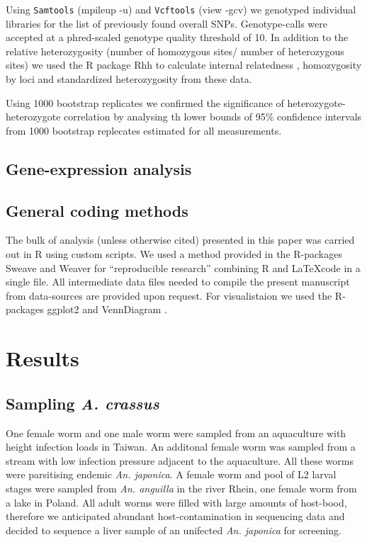 \documentclass[10pt]{bmc_article}
\newenvironment{bmcformat}{\begin{raggedright}\baselineskip20pt\sloppy\setboolean{publ}{false}}{\end{raggedright}\baselineskip20pt\sloppy}
\begin{document}
\begin{bmcformat}
Using \texttt{Samtools} \cite{journals/bioinformatics/LiHWFRHMAD09}
(mpileup -u) and \texttt{Vcftools}\cite{pmid21653522} (view -gcv) we
genotyped individual libraries for the list of previously found
overall SNPs. Genotype-calls were accepted at a phred-scaled genotype
quality threshold of 10. In addition to the relative heterozygosity
(number of homozygous sites/ number of heterozygous sites) we used the
R package Rhh \cite{pmid21565077} to calculate internal relatedness
\cite{pmid11571049}, homozygosity by loci \cite{pmid17107491} and
standardized heterozygosity \cite{coltman81j} from these data.

Using 1000 bootstrap replicates we confirmed the significance of
heterozygote-heterozygote correlation by analysing th lower bounds of
95\% confidence intervals from 1000 bootstrap replecates estimated for
all measurements.

\subsection*{Gene-expression analysis}




\subsection*{General coding methods}

The bulk of analysis (unless otherwise cited) presented in this paper
was carried out in R \cite{R_project} using custom scripts. We used a
method provided in the R-packages
Sweave\cite{lmucs-papers:Leisch:2002} and Weaver\cite{weaver} for
``reproducible research'' combining R and \LaTeX code in a single
file. All intermediate data files needed to compile the present
manuscript from data-sources are provided upon request. For
visualistaion we used the R-packages ggplot2 \cite{ggplot-book} and
VennDiagram \cite{pmid21269502}.


\section*{Results}


\subsection*{Sampling \textit{A. crassus}}

One female worm and one male worm were sampled from an aquaculture
with height infection loads in Taiwan. An additonal female worm was
sampled from a stream with low infection pressure adjacent to the
aquaculture. All these worms were parsitising endemic
\textit{An. japonica}. A female worm and pool of L2 larval stages were
sampled from \textit{An. anguilla} in the river Rhein, one female worm
from a lake in Poland. All adult worms were filled with large amounts
of host-bood, therefore we anticipated abundant host-contamination in
sequencing data and decided to sequence a liver sample of an unifected
\textit{An. japonica} for screening.


\end{bmcformat}
\end{document}
